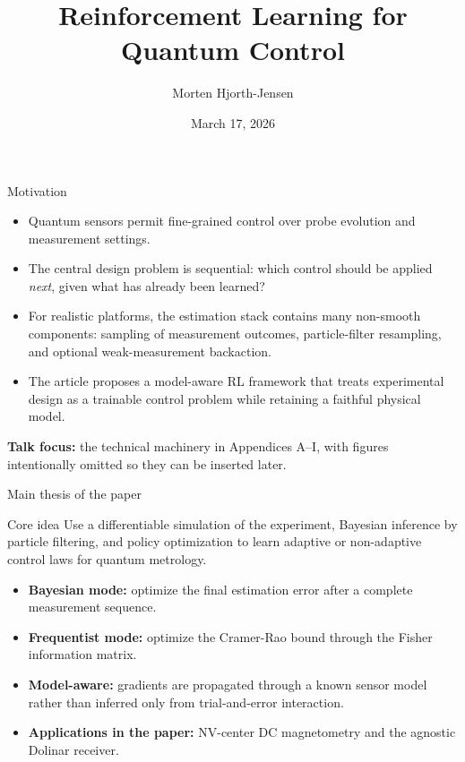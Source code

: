 \documentclass[aspectratio=169]{beamer}
\title{Reinforcement Learning for Quantum Control}
\author{Morten Hjorth-Jensen}
\date{March 17, 2026}
\begin{document}
\begin{frame}
  \titlepage
\end{frame}

\begin{frame}{Motivation}
\begin{itemize}
  \item Quantum sensors permit fine-grained control over probe evolution and measurement settings.
  \item The central design problem is sequential: which control should be applied \emph{next}, given what has already been learned?
  \item For realistic platforms, the estimation stack contains many non-smooth components: sampling of measurement outcomes, particle-filter resampling, and optional weak-measurement backaction.
  \item The article proposes a \alert{model-aware RL} framework that treats experimental design as a trainable control problem while retaining a faithful physical model.
\end{itemize}
\vspace{0.4em}
\textbf{Talk focus:} the technical machinery in Appendices A--I, with figures intentionally omitted so they can be inserted later.
\end{frame}

\begin{frame}{Main thesis of the paper}
\begin{block}{Core idea}
Use a differentiable simulation of the experiment, Bayesian inference by particle filtering, and policy optimization to learn adaptive or non-adaptive control laws for quantum metrology.
\end{block}
\begin{itemize}
  \item \textbf{Bayesian mode:} optimize the final estimation error after a complete measurement sequence.
  \item \textbf{Frequentist mode:} optimize the Cramer-Rao bound through the Fisher information matrix.
  \item \textbf{Model-aware:} gradients are propagated through a known sensor model rather than inferred only from trial-and-error interaction.
  \item \textbf{Applications in the paper:} NV-center DC magnetometry and the agnostic Dolinar receiver.
\end{itemize}
\end{frame}
\end{document}

